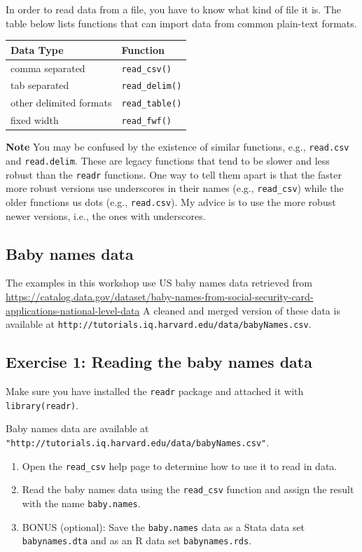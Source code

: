 \documentclass[]{book}
\begin{document}
In order to read data from a file, you have to know what kind of file it
is. The table below lists functions that can import data from common
plain-text formats.

\begin{longtable}[]{@{}ll@{}}
\toprule
Data Type & Function\tabularnewline
\midrule
\endhead
comma separated & \texttt{read\_csv()}\tabularnewline
tab separated & \texttt{read\_delim()}\tabularnewline
other delimited formats & \texttt{read\_table()}\tabularnewline
fixed width & \texttt{read\_fwf()}\tabularnewline
\bottomrule
\end{longtable}

\textbf{Note} You may be confused by the existence of similar functions,
e.g., \texttt{read.csv} and \texttt{read.delim}. These are legacy
functions that tend to be slower and less robust than the \texttt{readr}
functions. One way to tell them apart is that the faster more robust
versions use underscores in their names (e.g., \texttt{read\_csv}) while
the older functions us dots (e.g., \texttt{read.csv}). My advice is to
use the more robust newer versions, i.e., the ones with underscores.

\subsection{Baby names data}\label{baby-names-data}

The examples in this workshop use US baby names data retrieved from
\url{https://catalog.data.gov/dataset/baby-names-from-social-security-card-applications-national-level-data}
A cleaned and merged version of these data is available at
\texttt{http://tutorials.iq.harvard.edu/data/babyNames.csv}.

\subsection{Exercise 1: Reading the baby names
data}\label{exercise-1-reading-the-baby-names-data}

Make sure you have installed the \texttt{readr} package and attached it
with \texttt{library(readr)}.

Baby names data are available at
\texttt{"http://tutorials.iq.harvard.edu/data/babyNames.csv"}.

\begin{enumerate}
\def\labelenumi{\arabic{enumi}.}
\item
  Open the \texttt{read\_csv} help page to determine how to use it to
  read in data.
\item
  Read the baby names data using the \texttt{read\_csv} function and
  assign the result with the name \texttt{baby.names}.
\item
  BONUS (optional): Save the \texttt{baby.names} data as a Stata data
  set \texttt{babynames.dta} and as an R data set
  \texttt{babynames.rds}.
\end{enumerate}
\end{document}

